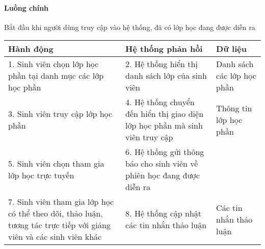 \documentclass[./../main_file.tex]{subfiles}
\begin{document}
\paragraph{Luồng chính}
Bắt đầu khi người dùng truy cập vào hệ thống, đã có lớp học đang được diễn ra
\begin{table}[H]
				\begin{tabular}{|p{.33\textwidth}|p{}|p{}|}
		\hline
		\textbf{Hành động}                                           & \textbf{Hệ thống phản hồi}                                                   & \textbf{Dữ liệu}           \\ \hline
		1. Sinh viên chọn lớp học phần tại danh mục các lớp học phần & 2. Hệ thống hiển thị danh sách lớp của sinh viên                             & Danh sách các lớp học phần \\ \hline
		3. Sinh viên truy cập lớp học phần                           & 4. Hệ thống chuyển đến hiển thị giao diện lớp học phần mà sinh viên truy cập & Thông tin lớp học phần     \\ \hline
		5. Sinh viên chọn tham gia lớp học trực tuyến                & 6. Hệ thống gửi thông báo cho sinh viên về phiên học đang được diễn ra       &                            \\ \hline
		7. Sinh viên tham gia lớp học có thể theo dõi, thảo luận, tương tác trực tiếp với giảng viên và các sinh viên khác &
		8. Hệ thống cập nhật các tin nhắn thảo luận &
		Các tin nhắn thảo luận \\ \hline
	\end{tabular}
\end{table}
\end{document}
